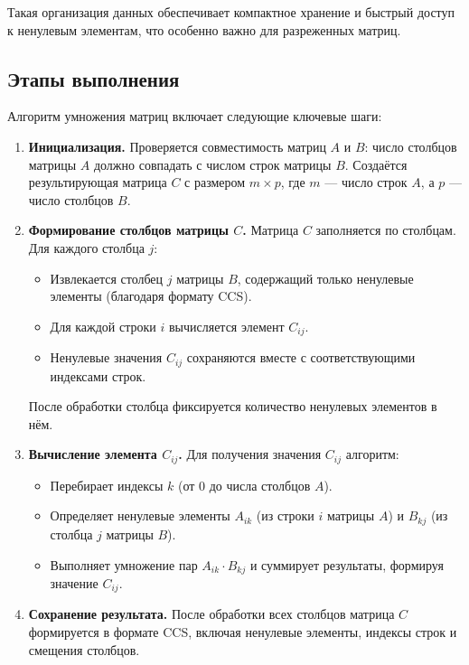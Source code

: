 \documentclass[12pt]{extarticle}
\begin{document}
Такая организация данных обеспечивает компактное хранение и быстрый доступ к ненулевым элементам, что особенно важно для разреженных матриц.

\subsection{Этапы выполнения}

\hspace*{1.25cm}Алгоритм умножения матриц включает следующие ключевые шаги:

\begin{enumerate}
    \item \textbf{Инициализация.} 
    Проверяется совместимость матриц $A$ и $B$: число столбцов матрицы $A$ должно совпадать с числом строк матрицы $B$. Создаётся результирующая матрица $C$ с размером $m \times p$, где $m$ — число строк $A$, а $p$ — число столбцов $B$.

    \item \textbf{Формирование столбцов матрицы $C$.} 
    Матрица $C$ заполняется по столбцам. Для каждого столбца $j$:
    \begin{itemize}
        \item Извлекается столбец $j$ матрицы $B$, содержащий только ненулевые элементы (благодаря формату CCS).
        \item Для каждой строки $i$ вычисляется элемент $C_{ij}$.
        \item Ненулевые значения $C_{ij}$ сохраняются вместе с соответствующими индексами строк.
    \end{itemize}
    После обработки столбца фиксируется количество ненулевых элементов в нём.

      \item \textbf{Вычисление элемента $C_{ij}$.} 
    Для получения значения $C_{ij}$ алгоритм:
    \begin{itemize}
        \item Перебирает индексы $k$ (от 0 до числа столбцов $A$).
        \item Определяет ненулевые элементы $A_{ik}$ (из строки $i$ матрицы $A$) и $B_{kj}$ (из столбца $j$ матрицы $B$).
        \item Выполняет умножение пар $A_{ik} \cdot B_{kj}$ и суммирует результаты, формируя значение $C_{ij}$.
    \end{itemize}

    \item \textbf{Сохранение результата.} 
    После обработки всех столбцов матрица $C$ формируется в формате CCS, включая ненулевые элементы, индексы строк и смещения столбцов.
\end{enumerate}
\end{document}
